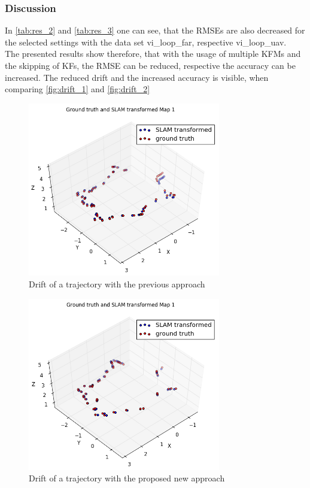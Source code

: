 \subsubsection{Discussion}
In \autoref{tab:res_2} and \autoref{tab:res_3} one can see, that the \acp{RMSE} are also decreased for the selected settings with the data set vi\_loop\_far, respective vi\_loop\_uav.\\

The presented results show therefore, that with the usage of multiple \acp{KFM} and the skipping of \acp{KF}, the \ac{RMSE} can be reduced, respective the accuracy can be increased. The reduced drift and the increased accuracy is visible, when comparing \autoref{fig:drift_1} and \autoref{fig:drift_2}

\begin{figure}[H]
	\centering
	\includegraphics[width=0.75\textwidth]{images/m1_skf0_cut}
	\caption{Drift of a trajectory with the previous approach}
	\label{fig:drift_1}
\end{figure}
\begin{figure}[H]
	\centering
	\includegraphics[width=0.75\textwidth]{images/m10_skf10_cut}
	\caption{Drift of a trajectory with the proposed new approach}
	\label{fig:drift_2}
\end{figure}

